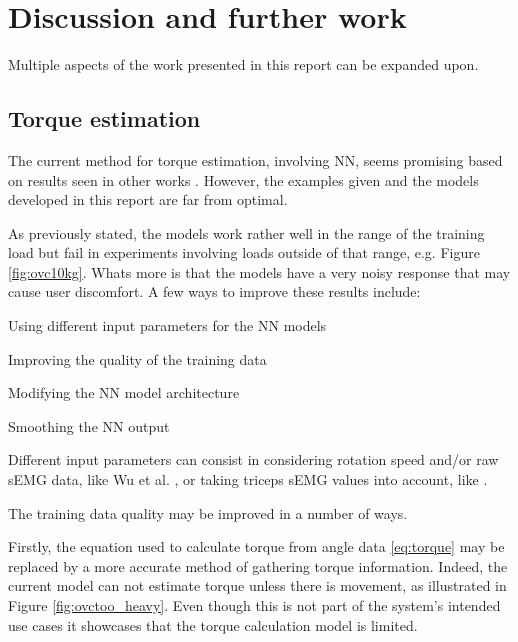 \chapter{Discussion and further work}
Multiple aspects of the work presented in this report can be expanded upon.

\section{Torque estimation}
The current method for torque estimation, involving NN, seems promising based 
on results seen in other works \cite{wu_neural-network-enhanced_2019, 
toro-ossaba_myoelectric_2024}. However, the examples given and the models 
developed in this report are far from optimal.  

As previously stated, the models work rather well in the range of the training 
load but fail in experiments involving loads outside of that range, e.g. 
Figure \ref{fig:ovc10kg}. Whats more is that the models have a very noisy response 
that may cause user discomfort. A few ways to improve these results include: 

\begin{IEEEitemize}
\item Using different input parameters for the NN models
\item Improving the quality of the training data
\item Modifying the NN model architecture 
\item Smoothing the NN output
\end{IEEEitemize}

\bigskip

Different input parameters can consist in considering rotation speed and/or 
raw sEMG data, like Wu et al. \cite{wu_neural-network-enhanced_2019}, or 
taking triceps sEMG values into account, like \cite{toro-ossaba_myoelectric_2024}. 

\bigskip

The training data quality may be improved in a number of ways.  

Firstly, the equation used to calculate torque from angle data \ref{eq:torque} 
may be replaced by a more accurate method of gathering torque information. 
Indeed, the current model can not estimate torque unless there is movement, 
as illustrated in Figure \ref{fig:ovctoo_heavy}. Even though this is not part of 
the system's intended use cases it showcases that the torque calculation model is 
limited.  

